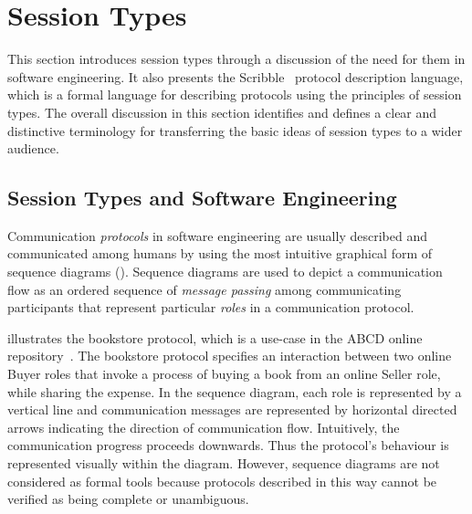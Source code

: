 
\section{Session Types}
\label{sec:session_types}


This section introduces session types through 
a discussion of the need for them in
software engineering.
It also presents the Scribble~\cite{scribble} protocol
description language, which is a formal language for describing
protocols using the principles of session types.
The overall discussion in this section identifies and defines
a clear and distinctive terminology 
for transferring the basic ideas of session
types to a wider audience.

\subsection{Session Types and Software Engineering}%
\label{sec:sessions_software}



Communication \emph{protocols} in software engineering
are usually described and communicated among humans
by using the most intuitive graphical form of sequence diagrams 
().
Sequence diagrams are used to depict a communication flow as an ordered
sequence of \emph{message passing} among communicating
participants that represent particular \emph{roles} in a communication
protocol.

 illustrates the bookstore protocol, which is a use-case
in the ABCD online repository~\cite{usecase_repository}.
The bookstore protocol specifies an interaction between two online Buyer roles
that invoke a process of buying a book from an online Seller role, while
sharing the expense.
In the sequence diagram, each role is represented by a vertical line and
communication messages are represented by horizontal directed arrows
indicating the direction of communication flow.
Intuitively, the communication progress proceeds downwards.
Thus the protocol's behaviour is represented visually within the diagram.
However, sequence diagrams are not considered as formal tools because
protocols described in this way cannot be verified as being complete or unambiguous.

